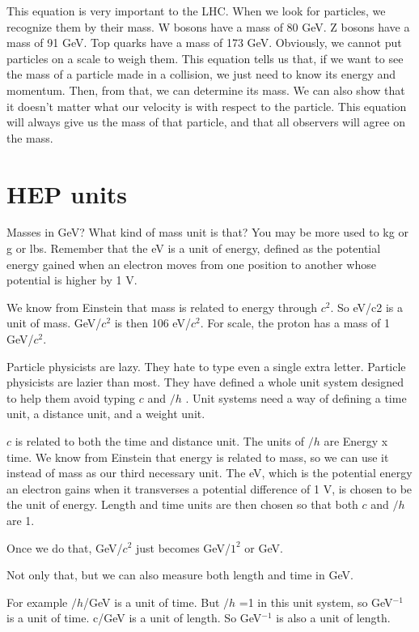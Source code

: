 This equation is very important to the LHC.  When we look for particles, we recognize them by their mass.  W bosons have a mass of 80 GeV.  Z bosons have a mass of 91 GeV.  Top quarks have a mass of 173 GeV.  Obviously, we cannot put particles on a scale to weigh them. This equation tells us that, if we want to see the mass of a particle made in a collision, we just need to know its energy and momentum.  Then, from that, we can determine its mass.  We can also show that it doesn’t matter what our velocity is with respect to the particle.  This equation will always give us the mass of that particle, and that all observers will agree on the mass.

\section{HEP units}

Masses in GeV?  What kind of mass unit is that? You may be more used to kg or g or lbs.  Remember that the eV is a unit of energy, defined as the potential energy gained when an electron moves from one position to another whose potential is higher by 1 V.

We know from Einstein that mass is related to energy through $c^2$.  So eV/c2 is a unit of mass.  GeV/$c^2$ is then 106 eV/$c^2$.  For scale, the proton has a mass of 1 GeV/$c^2$.

Particle physicists are lazy.  They hate to type even a single extra letter.  Particle physicists are lazier than most.  They have defined a whole unit system designed to help them avoid typing $c$ and $\slash h$ .  Unit systems need a way of defining a time unit, a distance unit, and a weight unit.  

$c$ is related to both the time and distance unit.  The units of  $\slash h$ are Energy x time. We know from Einstein that energy is related to mass, so we can use it instead of mass as our third necessary unit.  The eV, which is the potential energy an electron gains when it transverses a potential difference of 1 V, is chosen to be the unit of energy. Length and time units are then chosen so that both $c$ and $\slash h$  are 1.  

Once we do that, GeV/$c^2$ just becomes GeV/$1^2$ or GeV.

Not only that, but we can also measure both length and time in GeV.

For example  $\slash h$/GeV is a unit of time.  But $\slash h$ =1 in this unit system, so GeV$^{-1}$ is a unit of time.
 c/GeV is a unit of length.  So GeV$^{-1}$ is also a unit of length.

